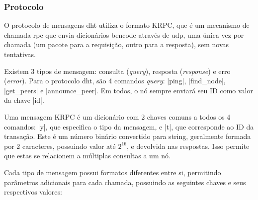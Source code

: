 
\subsubsection*{Protocolo}

O protocolo de mensagens \gls*{dht} utiliza o formato KRPC, que é um mecanismo de
chamada \gls{rpc} que envia dicionários \gls*{bencode} através de \gls*{udp}, uma única
vez por chamada (um pacote para a requisição, outro para a resposta), sem novas
tentativas.

Existem 3 tipos de mensagem: consulta (\emph{query}), resposta (\emph{response}) e erro
(\emph{error}). Para o protocolo \gls*{dht}, são 4 comandos \emph{query}: \bverb|ping|,
\bverb|find_node|, \bverb|get_peers| e \bverb|announce_peer|. Em todos, o nó sempre
enviará seu ID como valor da chave \bverb|id|.

Uma mensagem KRPC é um dicionário com 2 chaves comuns a todos os 4 comandos: \bverb|y|,
que especifica o tipo da mensagem, e \bverb|t|, que corresponde ao ID da transação.
Este é um número binário convertido para \gls*{string}, geralmente formada por 2
caracteres, possuindo valor até $2^{16}$, e devolvida nas respostas. Isso permite que
estas se relacionem a múltiplas consultas a um nó.

Cada tipo de mensagem possui formatos diferentes entre si, permitindo parâmetros
adicionais para cada chamada, possuindo as seguintes chaves e seus respectivos valores:

